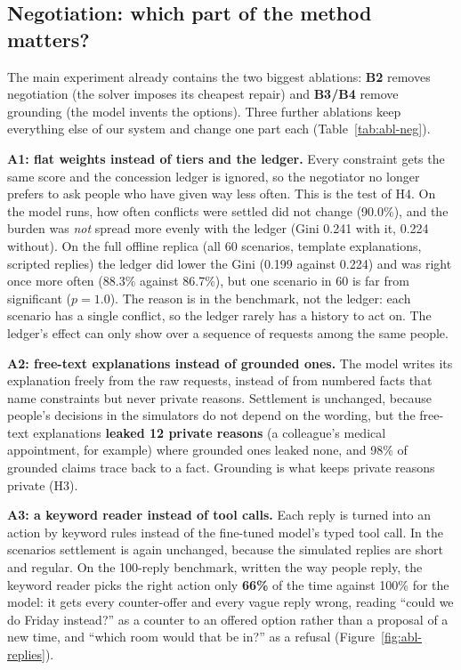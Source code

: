 \documentclass[11pt,a4paper]{article}
\begin{document}
\subsection{Negotiation: which part of the method matters?}
The main experiment already contains the two biggest ablations: \textbf{B2} removes negotiation (the solver imposes
its cheapest repair) and \textbf{B3/B4} remove grounding (the model invents the options). Three further ablations
keep everything else of our system and change one part each (Table~\ref{tab:abl-neg}).

\textbf{A1: flat weights instead of tiers and the ledger.} Every constraint gets the same score and the concession
ledger is ignored, so the negotiator no longer prefers to ask people who have given way less often. This is the test
of H4. On the model runs, how often conflicts were settled did not change (90.0\%), and the burden was \emph{not}
spread more evenly with the ledger (Gini 0.241 with it, 0.224 without). On the full offline replica (all 60
scenarios, template explanations, scripted replies) the ledger did lower the Gini (0.199 against 0.224) and was right
once more often (88.3\% against 86.7\%), but one scenario in 60 is far from significant ($p=1.0$). The reason is in the
benchmark, not the ledger: each scenario has a single conflict, so the ledger rarely has a history to act on. The
ledger's effect can only show over a sequence of requests among the same people.

\textbf{A2: free-text explanations instead of grounded ones.} The model writes its explanation freely from the raw
requests, instead of from numbered facts that name constraints but never private reasons. Settlement is unchanged,
because people's decisions in the simulators do not depend on the wording, but the free-text explanations
\textbf{leaked 12 private reasons} (a colleague's medical appointment, for example) where grounded ones leaked none,
and 98\% of grounded claims trace back to a fact. Grounding is what keeps private reasons private (H3).

\textbf{A3: a keyword reader instead of tool calls.} Each reply is turned into an action by keyword rules instead of
the fine-tuned model's typed tool call. In the scenarios settlement is again unchanged, because the simulated
replies are short and regular. On the 100-reply benchmark, written the way people reply, the keyword reader picks the
right action only \textbf{66\%} of the time against 100\% for the model: it gets every counter-offer and every vague
reply wrong, reading ``could we do Friday instead?'' as a counter to an offered option rather than a proposal of a
new time, and ``which room would that be in?'' as a refusal (Figure~\ref{fig:abl-replies}).
\end{document}
